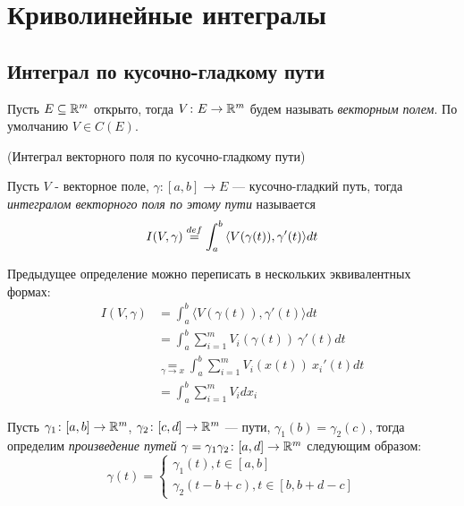 \chapter{Криволинейные интегралы}

\section{Интеграл по кусочно-гладкому пути}

\begin{definition}
    Пусть $E \subseteq \mathbb{R}^m$ открыто, тогда $V \colon E \to \mathbb{R}^m$ будем
    называть \textit{векторным полем}. По умолчанию $V \in C(E)$.
\end{definition}

\begin{definition}(Интеграл векторного поля по кусочно-гладкому пути)

    Пусть $V$ - векторное поле, $\gamma \colon [a, b] \to E$ --- кусочно-гладкий
    путь, тогда \textit{интегралом векторного поля по этому пути} называется
\[
    I(V, \gamma) \overset{def}{\underset{}{=}} \int_a^b{\langle V(\gamma(t)), \gamma'(t) \rangle dt}
\]
\end{definition}

\begin{remark}
    Предыдущее определение можно переписать в нескольких эквивалентных формах:
\begin{align*}
    I(V, \gamma) &= \int_a^b{\langle V(\gamma(t)), \gamma'(t) \rangle dt}\\
    &= \int_a^b{\sum_{i = 1}^{m}{V_i(\gamma(t)) ~ \gamma'(t)} dt}\\
    &\underset{\gamma \rightarrow x}{=}
    \int_a^b{\sum_{i = 1}^{m}{V_i(x(t)) ~ x_i'(t)} dt}\\
    &= \int_a^b{\sum_{i = 1}^{m}{V_i dx_i}}
\end{align*}
\end{remark}

\begin{definition}
    Пусть $\gamma_1 \colon [a, b] \to \mathbb{R}^m$, $\gamma_2 \colon [c, d] \to \mathbb{R}^m$ ---
    пути, $\gamma_1(b) = \gamma_2(c)$, тогда определим \textit{произведение путей}
    $\gamma = \gamma_1 \gamma_2 \colon [a, d] \to \mathbb{R}^m$ следующим образом:
\[
    \gamma(t) = \begin{cases}
                    \gamma_1(t), t \in [a, b] \\
                    \gamma_2(t - b + c), t \in [b, b + d - c]
                \end{cases}
\]
\end{definition}

